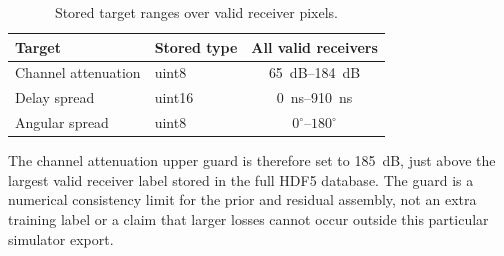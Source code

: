 \begin{table}[ht]
\centering
\small
\caption{Stored target ranges over valid receiver pixels.}
\label{tab:target_valid_ranges}
\begin{tabular}{llc}
\toprule
Target & Stored type & All valid receivers \\
\midrule
Channel attenuation & uint8 & \SIrange{65}{184}{dB} \\
Delay spread & uint16 & \SIrange{0}{910}{ns} \\
Angular spread & uint8 & \(0^\circ\)--\(180^\circ\) \\
\bottomrule
\end{tabular}
\end{table}

The channel attenuation upper guard is therefore set to \SI{185}{dB}, just
above the largest valid receiver label stored in the full HDF5 database. The
guard is a numerical consistency limit for the prior and residual assembly, not
an extra training label or a claim that larger losses cannot occur outside this
particular simulator export.

